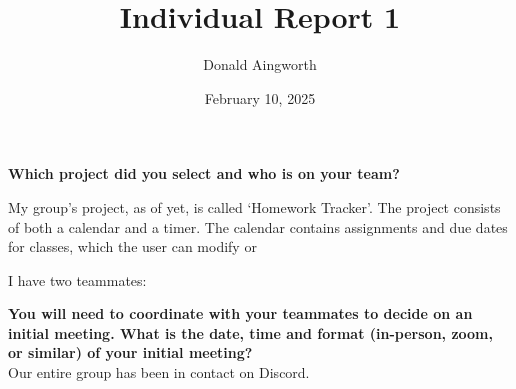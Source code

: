 \documentclass[12pt]{article}
\title{Individual Report 1}
\author{Donald Aingworth}
\date{February 10, 2025}
\begin{document}
\maketitle 

\textbf{Which project did you select and who is on your team?}

My group's project, as of yet, is called `Homework Tracker'. 
The project consists of both a calendar and a timer. 
The calendar contains assignments and due dates for classes, which the user can modify or 

I have two teammates: 

\textbf{You will need to coordinate with your teammates to decide on an initial meeting.  What is the date, time and format (in-person, zoom, or similar) of your initial meeting?}\\
Our entire group has been in contact on Discord. 
\end{document}
